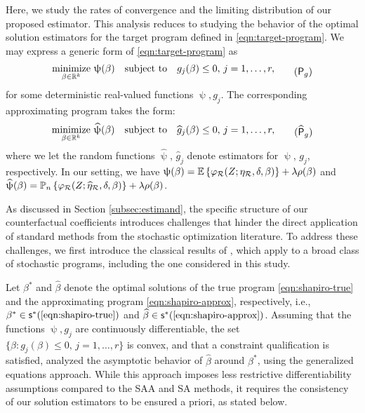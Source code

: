 Here, we study the rates of convergence and the limiting distribution of our proposed estimator. This analysis reduces to studying the behavior of the optimal solution estimators for the target program defined in \eqref{eqn:target-program}. We may express a generic form of \eqref{eqn:target-program} as
\begin{equation} \label{eqn:shapiro-true}
\begin{aligned} 
    \underset{\beta \in \R^k}{\text{minimize}} \,\,  \uppsi(\beta)  
    \quad \text{subject to} \quad g_j(\beta) \leq 0, \, j=1,\ldots,r, 
\end{aligned} \tag{$\mathsf{P}_{g}$}
\end{equation}
for some deterministic real-valued functions $\uppsi, g_j$. The corresponding approximating program takes the form:
\begin{equation} \label{eqn:shapiro-approx}
\begin{aligned} 
    \underset{\beta \in \R^k}{\text{minimize}} \,\,  \widehat{\uppsi}(\beta)  
    \quad \text{subject to} \quad \widehat{g}_j(\beta) \leq 0, \, j=1,\ldots,r,
\end{aligned} \tag{$\widehat{\mathsf{P}}_{g}$}
\end{equation}
where we let the random functions $\widehat{\uppsi}$, $\widehat{g}_j$ denote estimators for $\uppsi$, $g_j$, respectively. In our setting, we have $\uppsi(\beta)=\mathbb{E}\left\{ \varphi_{\mathcal{R}}(Z;\eta_{\mathcal{R}},\delta,\beta)\right\} + \lambda \rho(\beta)$ and $\widehat{\uppsi}(\beta)=\mathbb{P}_n\left\{ \varphi_{\mathcal{R}}(Z;\widehat{\eta}_{\mathcal{R}},\delta,\beta)\right\} + \lambda \rho(\beta)$. %

As discussed in Section \ref{subsec:estimand}, the specific structure of our counterfactual coefficients introduces challenges that hinder the direct application of standard methods from the stochastic optimization literature. To address these challenges, we first introduce the classical results of \citet{shapiro1993asymptotic}, which apply to a broad class of stochastic programs, including the one considered in this study. 

Let $\beta^*$ and $\widehat{\beta}$ denote the optimal solutions of the true program \eqref{eqn:shapiro-true} and the approximating program \eqref{eqn:shapiro-approx}, respectively, i.e., $\beta^* \in \mathsf{s}^*(\text{\ref{eqn:shapiro-true}})$ and $\widehat{\beta} \in \mathsf{s}^*(\text{\ref{eqn:shapiro-approx}})$. Assuming that the functions $\uppsi, g_j$ are continuously differentiable, the set \( \{\beta: g_j(\beta) \leq 0, \, j=1,\ldots,r\} \) is convex, and that a constraint qualification is satisfied, \citet{shapiro1993asymptotic} analyzed the asymptotic behavior of $\widehat{\beta}$ around $\beta^*$, using the generalized equations approach. While this approach imposes less restrictive differentiability assumptions compared to the SAA and SA methods, it requires the consistency of our solution estimators to be ensured a priori, as stated below.


